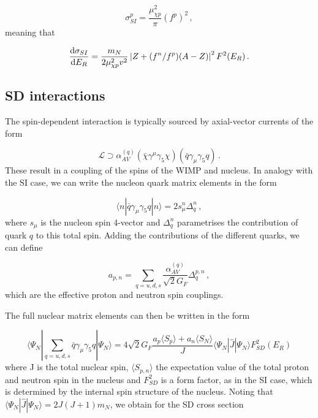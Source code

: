 \begin{equation}
\sigma_{SI}^p = \frac{\mu_{\chi p}^2}{\pi}(f^p)^2\,,
\end{equation}
meaning that

\begin{equation}
\frac{\mathrm{d}\sigma_{SI}}{\mathrm{d}E_R} = \frac{m_N}{ 2 \mu_{\chi p}^2 v^2} \left|Z + (f^n/f^p) (A-Z)\right|^2 F^2(E_R)\,.
\end{equation}





\subsection{SD interactions}

The spin-dependent interaction is typically sourced by axial-vector currents of the form

\begin{equation}
\label{eq:AVInt}
\mathcal{L} \supset \alpha_{AV}^{(q)} (\bar{\chi} \gamma^\mu \gamma_5 \chi) (\bar{q} \gamma_\mu \gamma_5 q)\,.
\end{equation}
These result in a coupling of the spins of the WIMP and nucleus. In analogy with the SI case, we can write the nucleon quark matrix elements in the form \cite{Engel:1991, Engel:1992}

\begin{equation}
\langle n | \bar{q} \gamma_\mu \gamma_5 q | n \rangle = 2 s_\mu^n \Delta_q^n\,,
\end{equation}
where $s_\mu$ is the nucleon  spin 4-vector and $\Delta_q^n$ parametrises the contribution of quark $q$ to this total spin. Adding the contributions of the different quarks, we can define

\begin{equation}
a_{p,n} = \sum_{q = u,d,s} \frac{\alpha_{AV}^{(q)}}{\sqrt{2}G_F} \Delta_q^{p,n}\,,
\end{equation}
which are the effective proton and neutron spin couplings. 

The full nuclear matrix elements can then be written in the form 

\begin{equation}
\langle \Psi_N | \sum_{q=u,d,s} \bar{q} \gamma_\mu \gamma_5 q | \Psi_N \rangle = 4 \sqrt{2} G_F \frac{a_p \langle S_p \rangle + a_n \langle S_N \rangle}{J} \langle \Psi_N | \hat{J} | \Psi_N \rangle F_{SD}^2(E_R)
\end{equation}
where J is the total nuclear spin, $\langle S_{p,n} \rangle$ the expectation value of the total proton and neutron spin in the nucleus and $F_{SD}^2$ is a form factor, as in the SI case, which is determined by the internal spin structure of the nucleus.  Noting that $\langle \Psi_N | \hat{J} | \Psi_N \rangle = 2J(J+1)m_N$, we obtain for the SD cross section

